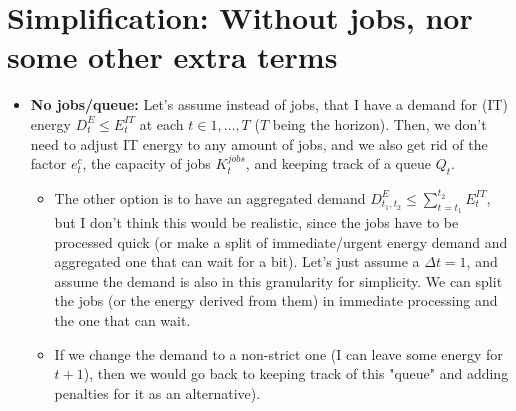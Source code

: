 \documentclass{article}
\begin{document}
\newpage
\section{Simplification: Without jobs, nor some other extra terms}

\begin{itemize}
    \item \textbf{No jobs/queue:}  Let's assume instead of jobs, that I have a demand for (IT) energy $D^E_t \leq E_t^{IT}$ at each $t \in 1,\ldots, T$ ($T$ being the horizon).
    Then, we don't need to adjust IT energy to any amount of jobs, and we also get rid of the factor $e^c_t$, the capacity of jobs $K^{jobs}_t$, and keeping track of a queue $Q_t$. 
    \begin{itemize}
        \item The other option is to have an aggregated demand $D_{t_1, t_2}^E \leq \sum_{t =t_1}^{t_2} E_t^{IT}$, but I don't think this would be realistic, since the jobs have to be processed quick (or make a split of immediate/urgent energy demand and aggregated one that can wait for a bit). Let's just assume a $\Delta t=1$, and assume the demand is also in this granularity for simplicity. We can split the jobs (or the energy derived from them) in immediate processing and the one that can wait.
        \item If we change the demand to a non-strict one (I can leave some energy for $t+1$), then we would go back to keeping track of this "queue" and adding penalties for it as an alternative). 
    \end{itemize}
\end{itemize}
\end{document}
